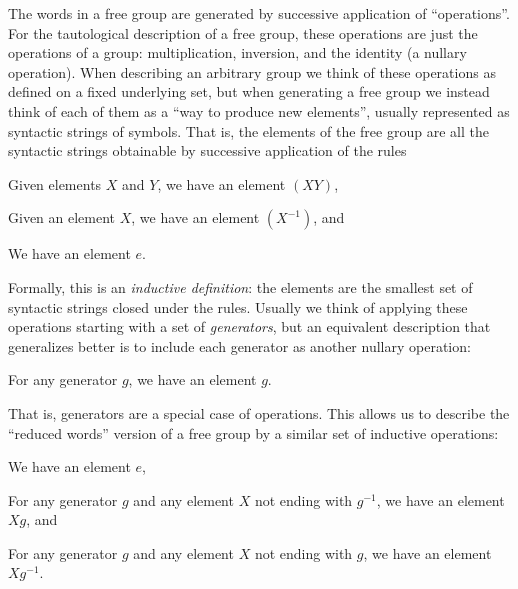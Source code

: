 \documentclass[12pt]{article}
\numberwithin{equation}{section}
\begin{document}
The words in a free group are generated by successive application of ``operations''.
For the tautological description of a free group, these operations are just the operations of a group: multiplication, inversion, and the identity (a nullary operation).
When describing an arbitrary group we think of these operations as defined on a fixed underlying set, but when generating a free group we instead think of each of them as a ``way to produce new elements'', usually represented as syntactic strings of symbols.
That is, the elements of the free group are all the syntactic strings obtainable by successive application of the rules
\begin{compactenum}[(i)]
\item Given elements $X$ and $Y$, we have an element $(X Y)$,
\item Given an element $X$, we have an element $(X^{-1})$, and
\item We have an element $e$.
\end{compactenum}
Formally, this is an \emph{inductive definition}: the elements are the smallest set of syntactic strings closed under the rules.
Usually we think of applying these operations starting with a set of \emph{generators}, but an equivalent description that generalizes better is to include each generator as another nullary operation:
\begin{compactenum}[(i)]\setcounter{enumi}{3}
\item For any generator $g$, we have an element $g$.
\end{compactenum}
That is, generators are a special case of operations.
This allows us to describe the ``reduced words'' version of a free group by a similar set of inductive operations:
\begin{compactenum}[(i)]
\item We have an element $e$,
\item For any generator $g$ and any element $X$ not ending with $g^{-1}$, we have an element $X g$, and
\item For any generator $g$ and any element $X$ not ending with $g$, we have an element $X g^{-1}$.
\end{compactenum}
\end{document}
